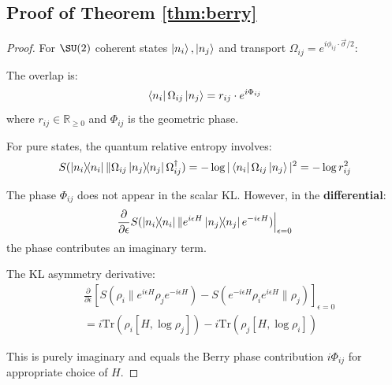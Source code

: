 \documentclass[11pt,a4paper]{article}
\newcommand{\Tr}{\mathrm{Tr}}
\newcommand{\R}{\mathbb{R}}
\begin{document}
\subsection{Proof of Theorem \ref{thm:berry}}

\begin{proof}
For $\SU(2)$ coherent states $\ket{n_i}, \ket{n_j}$ and transport $\Omega_{ij} = e^{i\phi_{ij} \cdot \vec{\sigma}/2}$:

The overlap is:
\begin{equation}
    \bra{n_i}\Omega_{ij}\ket{n_j} = r_{ij} \cdot e^{i\Phi_{ij}}
\end{equation}
where $r_{ij} \in \R_{\geq 0}$ and $\Phi_{ij}$ is the geometric phase.

For pure states, the quantum relative entropy involves:
\begin{equation}
    S(\ketbra{n_i} \| \Omega_{ij}\ketbra{n_j}\Omega_{ij}^\dagger) = -\log|\bra{n_i}\Omega_{ij}\ket{n_j}|^2 = -\log r_{ij}^2
\end{equation}

The phase $\Phi_{ij}$ does not appear in the scalar KL. However, in the \textbf{differential}:
\begin{equation}
    \frac{\partial}{\partial\epsilon} S(\ketbra{n_i} \| e^{i\epsilon H}\ketbra{n_j}e^{-i\epsilon H})\Big|_{\epsilon=0}
\end{equation}
the phase contributes an imaginary term.

The KL asymmetry derivative:
\begin{align}
    &\frac{\partial}{\partial\epsilon}\left[S(\rho_i \| e^{i\epsilon H}\rho_j e^{-i\epsilon H}) - S(e^{-i\epsilon H}\rho_i e^{i\epsilon H} \| \rho_j)\right]_{\epsilon=0} \\
    &= i\Tr(\rho_i[H, \log\rho_j]) - i\Tr(\rho_j[H, \log\rho_i])
\end{align}

This is purely imaginary and equals the Berry phase contribution $i\Phi_{ij}$ for appropriate choice of $H$.
\end{proof}
\end{document}
